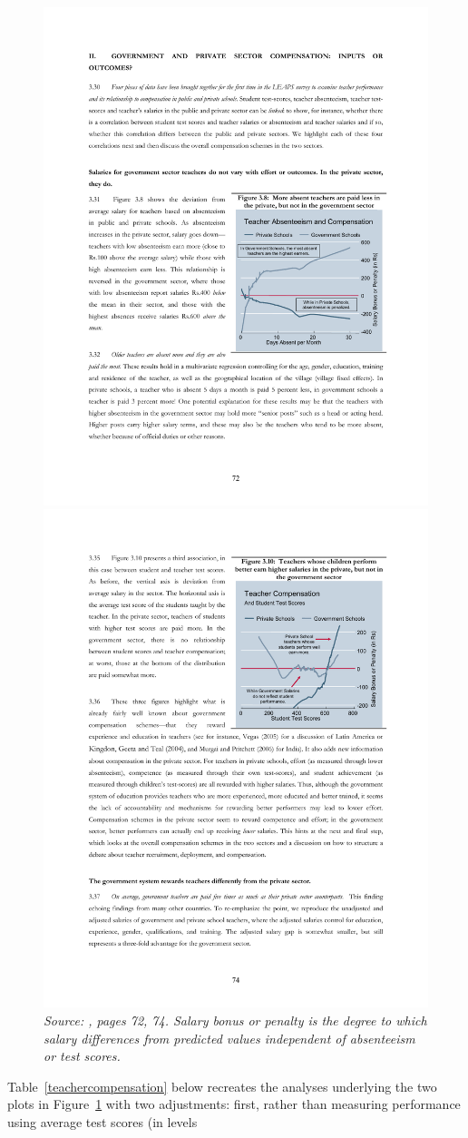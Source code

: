 \documentclass[Eubank_pk_ethnic_sorting.tex]{subfiles}
\begin{document}
\begin{figure}[htb]
	\begin{center}
	\caption{}\label{payandabsenteeism}
	\includegraphics[scale=0.82]{../graphs/absenteeism_and_pay.pdf} \includegraphics[scale=0.8]{../graphs/compensation_scores.pdf}\\
	\emph{Source: \cite{Andrabi:2007we}, pages 72, 74. Salary bonus or penalty is the degree to which salary differences from predicted values independent of absenteeism or test scores.}
	\end{center}
\end{figure}

Table~\ref{teachercompensation} below recreates the analyses underlying the two plots in Figure~\ref{payandabsenteeism} with two adjustments: first, rather than measuring performance using average test scores (in levels
\end{document}
